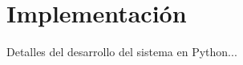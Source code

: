 \chapter{Implementación}
\label{chap:implementacion}

Detalles del desarrollo del sistema en Python...
